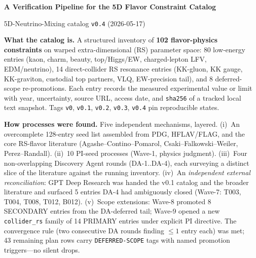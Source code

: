 \documentclass[11pt]{article}
\begin{document}
{\centering\Large\bfseries A Verification Pipeline for the 5D Flavor
Constraint Catalog\par}
{\centering\small 5D-Neutrino-Mixing catalog \texttt{v0.4} (2026-05-17)\par}
\vspace{4pt}

\textbf{What the catalog is.}
A structured inventory of \textbf{102 flavor-physics constraints} on warped
extra-dimensional (RS) parameter space: 80 low-energy entries (kaon, charm,
beauty, top/Higgs/EW, charged-lepton LFV, EDM/neutrino), 14 direct-collider
RS resonance entries (KK-gluon, KK gauge, KK-graviton, custodial top
partners, VLQ, EW-precision tail), and 8 deferred-scope re-promotions.
Each entry records the measured experimental value or limit with year,
uncertainty, source URL, access date, and \texttt{sha256} of a tracked
local text snapshot. Tags \verb|v0|, \verb|v0.1|, \verb|v0.2|, \verb|v0.3|,
\verb|v0.4| pin reproducible states.

\textbf{How processes were found.}
Five independent mechanisms, layered.
(i)~An overcomplete 128-entry seed list assembled from PDG, HFLAV/FLAG, and
the core RS-flavor literature (Agashe--Contino--Pomarol,
Csaki--Falkowski--Weiler, Perez--Randall).
(ii)~10 PI-seed processes (Wave-1, physics judgment).
(iii)~Four non-overlapping Discovery Agent rounds (DA-1..DA-4), each
surveying a distinct slice of the literature against the running inventory.
(iv)~An \emph{independent external reconciliation}: GPT Deep Research was
handed the v0.1 catalog and the broader literature and surfaced 5 entries
DA-4 had ambiguously closed (Wave-7: T003, T004, T008, T012, B012).
(v)~Scope extensions: Wave-8 promoted 8 SECONDARY entries from the
DA-deferred tail; Wave-9 opened a new \texttt{collider\_rs} family of 14
PRIMARY entries under explicit PI directive.
The convergence rule (two consecutive DA rounds finding $\le 1$ entry each)
was met; 43 remaining plan rows carry \texttt{DEFERRED-SCOPE} tags with
named promotion triggers---no silent drops.
\end{document}
